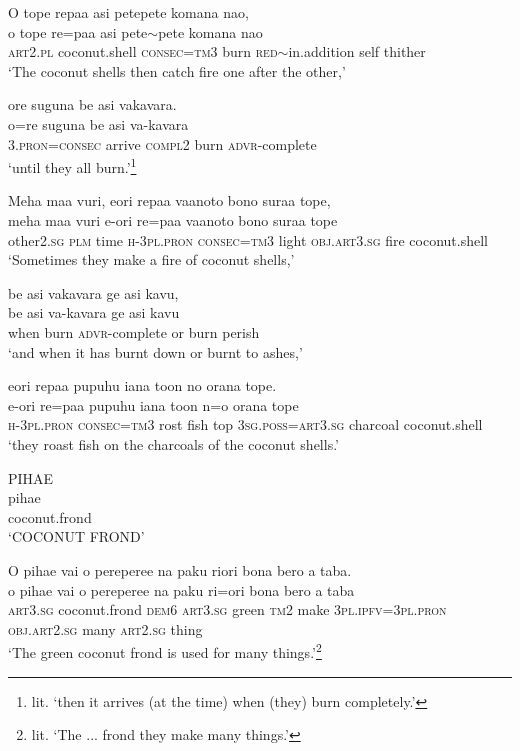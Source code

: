 \newpage
\ea\label{ex:text01-94}
O tope repaa asi petepete komana nao,\\
\gll o	tope	re=paa	asi	pete{$\sim$}pete	komana	nao\\
     \textsc{art}2.\textsc{pl}	coconut.shell	\textsc{consec}=\textsc{tm}3	burn	\textsc{red}{$\sim$}in.addition	self	thither\\
\glt `The coconut shells then catch fire one after the other,'
\z

\ea\label{ex:text01-95}
ore suguna be asi vakavara.\\
\gll o=re	suguna	be	asi	va-kavara\\
     3.\textsc{pron}=\textsc{consec}	arrive	\textsc{compl}2	burn	\textsc{advr}-complete\\
\glt `until they all burn.'\footnote{lit. `then it arrives (at the time) when (they) burn completely.'}
\z

\ea\label{ex:text01-96}
Meha maa vuri, eori repaa vaanoto bono suraa tope,\\
\gll meha	maa	vuri	e-ori	re=paa	vaanoto	bono	suraa	tope\\
     other2.\textsc{sg}	\textsc{plm}	time	\textsc{h}-3\textsc{pl}.\textsc{pron}	\textsc{consec}=\textsc{tm}3	light	\textsc{obj}.\textsc{art}3.\textsc{sg}	fire	coconut.shell\\
\glt `Sometimes they make a fire of coconut shells,'
\z

\ea\label{ex:text01-97}
be asi vakavara ge asi kavu,\\
\gll be	asi	va-kavara	ge	asi	kavu\\
     when	burn	\textsc{advr}-complete	or	burn	perish\\
\glt `and when it has burnt down or burnt to ashes,'
\z

\ea\label{ex:text01-98}
eori repaa pupuhu iana toon no orana tope.\\
\gll e-ori	re=paa	pupuhu	iana	toon	n=o	orana	tope\\
     \textsc{h}-3\textsc{pl}.\textsc{pron}	\textsc{consec}=\textsc{tm}3	rost	fish	top	3\textsc{sg}.\textsc{poss}=\textsc{art}3.\textsc{sg}	charcoal	coconut.shell\\
\glt `they roast fish on the charcoals of the coconut shells.'
\z

\ea\label{ex:text01-99}
PIHAE\\
\gll pihae\\
     coconut.frond\\
\glt `COCONUT FROND'
\z

\newpage
\ea\label{ex:text01-100}
O pihae vai o pereperee na paku riori bona bero a taba.\\
\gll o	pihae	vai	o	pereperee	na	paku	ri=ori	bona	bero	a	taba\\
     \textsc{art}3.\textsc{sg}	coconut.frond	\textsc{dem}6	\textsc{art}3.\textsc{sg}	green	\textsc{tm}2	make	3\textsc{pl}.\textsc{ipfv}=3\textsc{pl}.\textsc{pron}	\textsc{obj}.\textsc{art}2.\textsc{sg}	many	\textsc{art}2.\textsc{sg}	thing\\
\glt `The green coconut frond is used for many things.'\footnote{lit. `The ... frond they make many things.'}
\z

